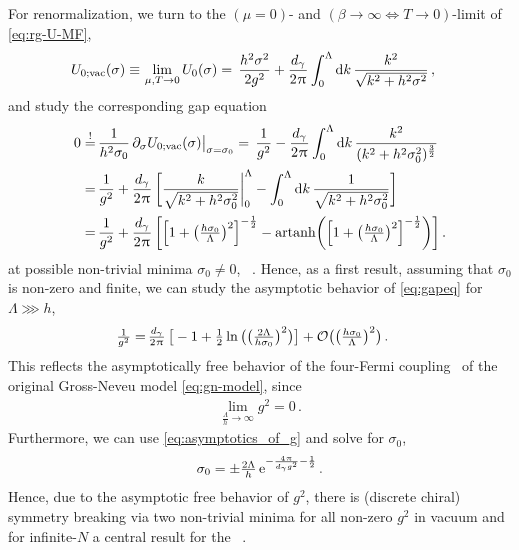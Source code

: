 For renormalization, we turn to the $(\mu = 0)$- and $(\beta \rightarrow \infty\Leftrightarrow T\rightarrow 0)$-limit of \cref{eq:rg-U-MF},
\begin{align}
	U_{0;\mathrm{vac}} (\sigma ) \equiv \, & \lim\limits_{\mu,T \rightarrow 0} U_0 ( \sigma ) =	 \, \frac{h^2 \sigma^2}{2 g^2} + \frac{d_\gamma}{2 \piu} \int_{0}^{\Lambda} \dif k \, \frac{k^2}{\sqrt{ k^2 + h^2 \sigma^2 }} \, ,	\label{eq:ir_potential_mean-field_vac}
\end{align}
and study the corresponding gap equation
\begin{subequations} \label{eq:gapeq}
\begin{align}
	0 \overset{!}{=} \, & \frac{1}{h^2\sigma_0} \, \partial_{ \sigma} U_{0;\mathrm{vac}} (\sigma ) \big|_{ \sigma = \sigma_0} =	\,  \frac{1}{g^2} - \frac{d_\gamma}{2\piu} \int_{0}^{\Lambda} \dif k \, \frac{k^2}{( k^2 + h^2 \sigma_0^2 )^\frac{3}{2}} \\*[.1em] %
	= \, & \frac{1}{g^2} + \frac{d_\gamma}{2 \piu} \, \bigg[ \frac{k}{\sqrt{ k^2 + h^2 \sigma_0^2 }} \bigg|_0^\Lambda - \int_{0}^{\Lambda} \dif k \, \frac{1}{\sqrt{ k^2 + h^2 \sigma_0^2 }}\bigg]	
	\\*[.1em] %
	= \, & \frac{1}{g^2} + \frac{d_\gamma}{2 \piu} \, \bigg[ \Big[ 1 + \big( \tfrac{h \sigma_0}{\Lambda} \big)^2 \Big]^{- \frac{1}{2}} - \mathrm{artanh} \bigg( \Big[ 1 + \big( \tfrac{h \sigma_0}{\Lambda} \big)^2 \Big]^{- \frac{1}{2}} \bigg) \bigg] \,. 
\end{align}
\end{subequations}
at possible non-trivial minima $\sigma_0 \neq 0$, \cf{}\ .
Hence, as a first result, assuming that $\sigma_0$ is non-zero and finite, we can study the asymptotic behavior of \cref{eq:gapeq} for $\Lambda \ggg h$,
\begin{align}
	\tfrac{1}{g^2} = \, & \tfrac{d_\gamma}{2 \mkern1.0mu\uppi\mkern1.0mu} \, \big[ - 1 + \tfrac{1}{2} \ln \big( \big( \tfrac{2 \Lambda}{h \sigma_0} \big)^2 \big) \big] + \mathcal{O} \big( \big( \tfrac{h \sigma_0}{\Lambda} \big)^2 \big) \, .	\label{eq:asymptotics_of_g}
\end{align}
This reflects the asymptotically free behavior of the four-Fermi coupling~\cite{Gross:1974jv,ZinnJustin:2002ru,Peskin:1995ev} of the original Gross-Neveu model \eqref{eq:gn-model}, since
\begin{align}
	\lim\limits_{\frac{\Lambda}{h} \rightarrow \infty} g^2 = 0 \, .
\end{align}
Furthermore, we can use \eqref{eq:asymptotics_of_g} and solve for $\sigma_0$,
\begin{align}
	\sigma_0 = \pm \tfrac{2 \Lambda}{h} \, \mathrm{e}^{- \frac{4 \mkern1.0mu\uppi\mkern1.0mu}{d_\gamma g^2} -\frac{1}{2} } \, .
\end{align}
Hence, due to the asymptotic free behavior of $g^2$, there is \ZII{} (discrete chiral) symmetry breaking via two non-trivial minima for all non-zero $g^2$ in vacuum and for infinite-$N$ \dash{} a central result for the \gnm{}~\cite{Gross:1974jv}.


